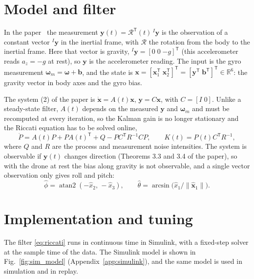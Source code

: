 \documentclass[11pt,a4paper]{article}
\newcommand{\vect}[1]{\boldsymbol{#1}}
\begin{document}
\section{Model and filter}
\label{sec:model}

In the paper~\cite{batista2011} the measurement $\vect{y}(t)=\mathcal{R}^{\mathsf T}(t)\,{}^{I}\vect{y}$ is the observation of a constant vector ${}^{I}\vect{y}$ in the inertial frame, with $\mathcal{R}$ the rotation from the body to the inertial frame.
Here that vector is gravity, ${}^{I}\vect{y}=[0\;0\;{-g}]^{\mathsf T}$ (this accelerometer reads $a_z=-g$ at rest), so $\vect{y}$ is the accelerometer reading.
The input is the gyro measurement $\vect{\omega}_m=\vect{\omega}+\vect{b}$, and the state is $\vect{x}=[\vect{x}_1^{\mathsf T}\;\vect{x}_2^{\mathsf T}]^{\mathsf T}=[\vect{y}^{\mathsf T}\;\vect{b}^{\mathsf T}]^{\mathsf T}\in\mathbb{R}^6$: the gravity vector in body axes and the gyro bias.

The system (2) of the paper is $\dot{\vect{x}}=A(t)\vect{x}$, $\vect{y}=C\vect{x}$, with $C=[I\;0]$.
Unlike a steady-state filter, $A(t)$ depends on the measured $\vect{y}$ and $\vect{\omega}_m$ and must be recomputed at every iteration, so the Kalman gain is no longer stationary and the Riccati equation has to be solved online,
\begin{equation}
\dot P = A(t)P + PA(t)^{\mathsf T} + Q - PC^{\mathsf T}R^{-1}CP, \qquad K(t) = P(t)C^{\mathsf T}R^{-1},
\label{eq:riccati}
\end{equation}
where $Q$ and $R$ are the process and measurement noise intensities.
The system is observable if $\vect{y}(t)$ changes direction (Theorems 3.3 and 3.4 of the paper), so with the drone at rest the bias along gravity is not observable, and a single vector observation only gives roll and pitch:
\begin{equation}
\hat\phi = \operatorname{atan2}(-\hat x_2,\,-\hat x_3), \qquad
\hat\theta = \arcsin\!\big(\hat x_1 / \|\hat{\vect{x}}_1\|\big).
\label{eq:angles}
\end{equation}

\section{Implementation and tuning}
\label{sec:impl}

The filter \eqref{eq:riccati} runs in continuous time in Simulink, with a fixed-step solver at the sample time of the data.
The Simulink model is shown in Fig.~\ref{fig:sim_model} (Appendix~\ref{app:simulink}), and the same model is used in simulation and in replay.
\end{document}
